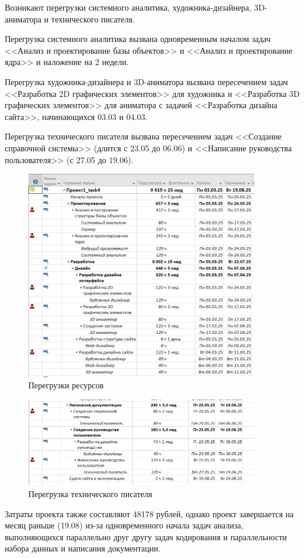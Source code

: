 Возникают перегрузки системного аналитика, художника-дизайнера, 3D-аниматора и технического писателя.

Перегрузка системного аналитика вызвана одновременным началом задач <<Анализ и проектирование базы объектов>> и <<Анализ и проектирование ядра>> и наложение на 2 недели.

Перегрузка художника-дизайнера и 3D-аниматора вызвана пересечением задач <<Разработка 2D графических элементов>> для художника и <<Разработка 3D графических элементов>> для аниматора с задачей <<Разработка дизайна сайта>>, начинающихся 03.03 и 04.03.

Перегрузка технического писателя вызвана пересечением задач <<Создание справочной системы>> (длится с 23.05 до 06.06) и <<Написание руководства пользователя>> (с 27.05 до 19.06).

\begin{figure}[H]
	\centering
	\includegraphics[width=0.9\textwidth]{img/screen5_4.jpg}
	\caption{Перегрузки ресурсов}
	\label{fig:screen12}
\end{figure}

\begin{figure}[H]
	\centering
	\includegraphics[width=0.9\textwidth]{img/screen5_5.jpg}
	\caption{Перегрузка технического писателя}
	\label{fig:screen13}
\end{figure}

Затраты проекта также составляют 48178 рублей, однако проект завершается на месяц раньше (19.08) из-за одновременного начала задач анализа, выполняющихся параллельно друг другу задач кодирования и параллельности набора данных и написания документации.
